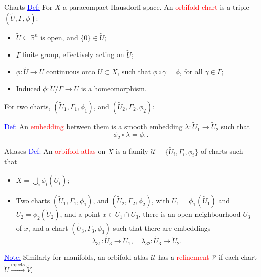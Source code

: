 \documentclass[aspectratio=169,xcolor=dvipsnames]{beamer}
\newcommand{\ra}{\rightarrow}
\newcommand{\RR}{\mathbb{R}}
\begin{document}
\begin{frame}{Charts}
	\textcolor{blue}{\underline{Def:}} For $X$ a paracompact Hausdorff space. An \textcolor{red}{orbifold chart} is a triple $(\widetilde{U}, \Gamma, \phi)$:
	\begin{itemize}
		\item $\widetilde{U} \subseteq \RR^{n}$ is open, and $\{0\} \in \widetilde{U}$;
		\item $\Gamma$ finite group, effectively acting on $\widetilde{U}$;
		\item $\phi : \widetilde{U} \ra U$ continuous onto $U \subset X$, \newline such that $\phi \circ \gamma = \phi$, for all $\gamma \in \Gamma$;
		\item Induced $\phi : \widetilde{U}/\Gamma \ra U$ is a homeomorphism.\newline
	\end{itemize}
	
	For two charts, $(\widetilde{U}_{1}, \Gamma_{1}, \phi_{1})$, and $(\widetilde{U}_{2}, \Gamma_{2}, \phi_{2})$: \newline
	
	\textcolor{blue}{\underline{Def:}} An \textcolor{red}{embedding} between them is a smooth embedding $\lambda : \widetilde{U}_{1} \ra \widetilde{U}_{2}$ such that
	\[
	\phi_{2} \circ \lambda = \phi_{1}.    
	\]
\end{frame}

\begin{frame}{Atlases}
	\textcolor{blue}{\underline{Def:}} An \textcolor{red}{orbifold atlas} on $X$ is a family $\mathcal{U} = \{\widetilde{U}_{i}, \Gamma_{i}, \phi_{i}\}$ of charts such that
	\begin{itemize}
		\item $X = \bigcup_{i} \phi_{i}(\widetilde{U}_{i})$;
		\item Two charts $(\widetilde{U}_{1}, \Gamma_{1}, \phi_{1})$, and $(\widetilde{U}_{2}, \Gamma_{2}, \phi_{2})$, with $U_{1} = \phi_{1}(\widetilde{U}_{1})$ and $U_{2} = \phi_{2}(\widetilde{U}_{2})$, and a point $x \in U_{1} \cap U_{3}$, there is an open neighbourhood $U_{3}$ of $x$, and a chart $(\widetilde{U}_{3}, \Gamma_{3}, \phi_{3})$ such that there are embeddings
		\[
		\lambda_{31} : \widetilde{U}_{3} \ra \widetilde{U}_{1}, \quad \lambda_{32} : \widetilde{U}_{3} \ra \widetilde{U}_{2}.
		\]
	\end{itemize}
	\textcolor{blue}{\underline{Note:}} Similarly for manifolds, an orbifold atlas $\mathcal{U}$ has a \textcolor{red}{refinement} $\mathcal{V}$ if each chart $\widetilde{U} \overset{\text{injects}}{\longrightarrow} \widetilde{V}$.
\end{frame}
\end{document}
